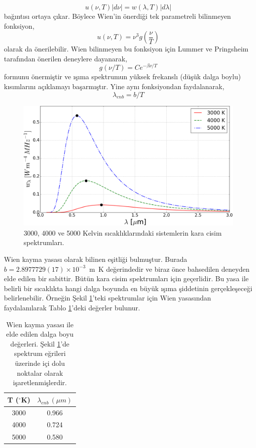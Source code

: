 \documentclass[a4paper,12pt, twoside]{article}
\begin{document}
\begin{equation}
\label{eq:uw_densities3}
u(\nu,T)|d\nu| = w(\lambda,T)|d\lambda|
\end{equation}
bağıntısı ortaya çıkar. Böylece Wien'in önerdiği tek parametreli bilinmeyen fonksiyon,
\begin{equation}
\label{eq:ug_lambdaT}
u(\nu,T) = \nu^3 g(\frac{\nu}{T})
\end{equation}
olarak da önerilebilir. Wien bilinmeyen bu fonksiyon için Lummer ve Pringsheim tarafından önerilen deneylere dayanarak,
\begin{equation}
\label{eq:g_lambdaT}
g(\nu/T) = C e^{-\beta \nu/T}
\end{equation}
formunu önermiştir ve ışıma spektrumun yüksek frekanslı (düşük dalga boylu) kısımlarını açıklamayı başarmıştır. Yine aynı fonksiyondan faydalanarak,
\begin{equation}
\label{eq:wien_shift}
\lambda_{enb} = b/T 
\end{equation}
\begin{figure}[hbtp]
\center
\includegraphics[scale=.4]{blackbody_spect_vs_wavelength.png}
\caption{3000, 4000 ve 5000 Kelvin sıcaklıklarındaki sistemlerin kara cisim spektrumları.}
\label{fig:karaSpektrum}
\end{figure}
Wien kayma yasası olarak bilinen eşitliği bulmuştur. Burada $b = 2.8977729(17)\times10^{-3}$~m~K değerindedir ve biraz önce bahsedilen deneyden elde edilen bir sabittir. Bütün kara cisim spektrumları için geçerlidir. Bu yasa ile belirli bir sıcaklıkta hangi dalga boyunda en büyük ışıma şiddetinin gerçekleşeceği belirlenebilir. Örneğin Şekil \ref{fig:karaSpektrum}'teki spektrumlar için Wien yasasından faydalanılarak Tablo \ref{tab:wien_shift}'deki değerler bulunur.
\begin{table}[hbtp]
\center
\begin{tabular}{|c|c|}
\hline
T ($^\circ$K) & $\lambda_{enb}\,(\mu m)$\\
\hline
3000 & 0.966 \\
4000 & 0.724 \\
5000 & 0.580 \\
\hline
\end{tabular}
\caption{\label{tab:wien_shift} Wien kayma yasası ile elde edilen dalga boyu değerleri. Şekil \ref{fig:karaSpektrum}'de spektrum eğrileri üzerinde içi dolu noktalar olarak işaretlenmişlerdir.}
\end{table}
\end{document}
